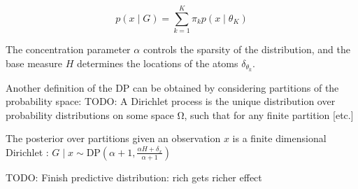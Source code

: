 \documentclass[twoside]{article}
\newcommand{\DP}{\mathrm{DP}}
\newcommand{\todo}[1]{{\color{red} TODO: #1}}
\begin{document}
$$ p(x \mid G) = \sum_{k=1}^K \pi_k p(x \mid \theta_K) $$

The concentration parameter $\alpha$ controls the sparsity of the distribution, and the base measure $H$ determines the locations of the atoms $\delta_{\theta_k}$.

Another definition of the DP can be obtained by considering partitions of the probability space: \todo{A Dirichlet process is the unique distribution over probability distributions on some space Ω, such that for any finite partition [etc.]}

The posterior over partitions given an observation $x$ is a finite dimensional Dirichlet :
$ G \mid x \sim \DP(\alpha+1, \frac{\alpha H + \delta_x}{\alpha + 1})$

\todo{Finish predictive distribution: rich gets richer effect}
\end{document}
